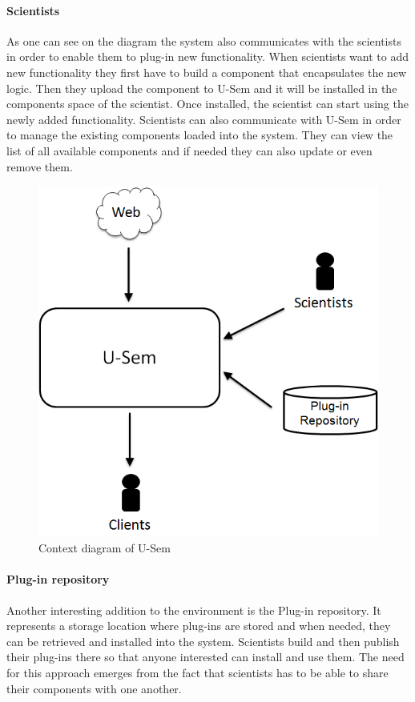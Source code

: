 \paragraph{Scientists}
As one can see on the diagram the system also communicates with the scientists in order to enable them to plug-in new functionality. When scientists want to add new functionality they first have to build a component that encapsulates the new logic. Then they upload the component to U-Sem and it will be installed in the components space of the scientist. Once installed, the scientist can start using the newly added functionality. Scientists can also communicate with U-Sem in order to manage the existing components loaded into the system. They can view the list of all available components and if needed they can also update or even remove them. 

\begin{figure}[h!]
  \centering
  	\includegraphics[scale=0.5]{plug-in/environment/runtime_env.png}
  \caption{Context diagram of U-Sem }
  \label{fig_context}
\end{figure}

\paragraph{Plug-in repository}
Another interesting addition to the environment is the Plug-in repository. It represents a storage location where plug-ins are stored and when needed, they can be retrieved and installed into the system. Scientists build and then publish their plug-ins there so that anyone interested can install and use them. The need for this approach emerges from the fact that scientists has to be able to share their components with one another.

